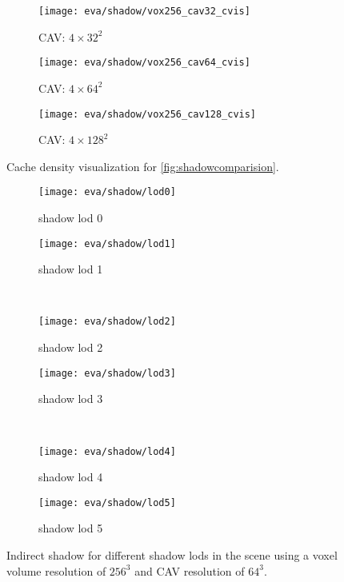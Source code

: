\documentclass[thesis.tex]{subfiles}
\begin{document}
%
\begin{figure}
\begin{subfigure}[b]{0.32\textwidth}
\texttt{[image: eva/shadow/vox256\_cav32\_cvis]}
\caption{CAV: $4\times32^2$}
\end{subfigure}
\begin{subfigure}[b]{0.32\textwidth}
\texttt{[image: eva/shadow/vox256\_cav64\_cvis]}
\caption{CAV: $4\times64^2$}
\end{subfigure}
\begin{subfigure}[b]{0.32\textwidth}
\texttt{[image: eva/shadow/vox256\_cav128\_cvis]}
\caption{CAV: $4\times128^2$}
\end{subfigure}
\caption{Cache density visualization for \autoref{fig:shadowcomparision}.}
\label{fig:shadowcomparision:resolutions:cavdensities}
\end{figure}
%
\begin{figure}
\begin{subfigure}[b]{\halfpageimage}
\texttt{[image: eva/shadow/lod0]}
\caption{shadow lod 0}
\end{subfigure}
\begin{subfigure}[b]{\halfpageimage}
\texttt{[image: eva/shadow/lod1]}
\caption{shadow lod 1}
\end{subfigure}
\\
\begin{subfigure}[b]{\halfpageimage}
\texttt{[image: eva/shadow/lod2]}
\caption{shadow lod 2}
\end{subfigure}
\begin{subfigure}[b]{\halfpageimage}
\texttt{[image: eva/shadow/lod3]}
\caption{shadow lod 3}
\end{subfigure}
\\
\begin{subfigure}[b]{\halfpageimage}
\texttt{[image: eva/shadow/lod4]}
\caption{shadow lod 4}
\end{subfigure}
\begin{subfigure}[b]{\halfpageimage}
\texttt{[image: eva/shadow/lod5]}
\caption{shadow lod 5}
\end{subfigure}
\caption{Indirect shadow for different shadow lods in the  scene using a voxel volume resolution of $256^3$ and CAV resolution of $64^3$. }
\label{fig:shadowcomparision:lod}
\end{figure}
%
\end{document}
